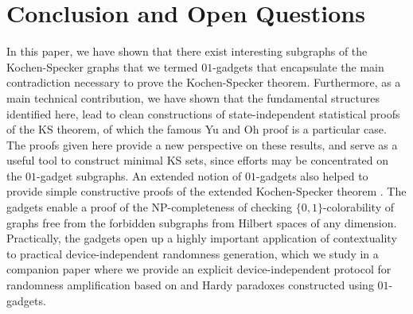 \documentclass[twocolumn, a4paper, superscriptaddress,nofootinbib, accepted=2020-08-07, hyperref]{quantumarticle}
\begin{document}
\section{Conclusion and Open Questions}\label{sec:concl}
In this paper, we have shown that there exist interesting subgraphs of the Kochen-Specker graphs that we termed $01$-gadgets that encapsulate the main contradiction necessary to prove the  Kochen-Specker theorem. Furthermore, as a main technical contribution, we have shown that the fundamental structures identified here, lead to clean constructions of state-independent statistical proofs of the KS theorem, of which the famous Yu and Oh proof is a particular case. The proofs given here provide a new perspective on these results, and serve as a useful tool to construct minimal KS sets, since efforts may be concentrated on the $01$-gadget subgraphs. 
An extended notion of $01$-gadgets also helped to provide simple constructive proofs of the extended Kochen-Specker theorem \cite{Pitowsky}. The gadgets enable a proof of the NP-completeness of checking $\{0,1\}$-colorability of graphs free from the forbidden subgraphs from Hilbert spaces of any dimension. Practically, the gadgets open up a highly important application of contextuality to practical device-independent randomness generation, which we study in a companion paper \cite{R17} where we provide an explicit device-independent protocol for randomness amplification based on \cite{BRGH+16, PRL-rand, WBGH+16} and Hardy paradoxes constructed using $01$-gadgets. %


\end{document}
